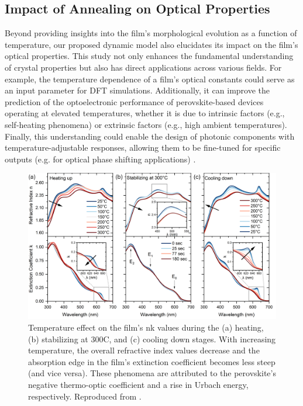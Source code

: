 \subsection{Impact of Annealing on Optical Properties}

Beyond providing insights into the film's morphological evolution as a function of temperature, our proposed dynamic model also elucidates its impact on the film’s optical properties. This study not only enhances the fundamental understanding of crystal properties but also has direct applications across various fields. For example, the temperature dependence of a film's optical constants could serve as an input parameter for DFT simulations. Additionally, it can improve the prediction of the optoelectronic performance of perovskite-based devices operating at elevated temperatures, whether it is due to intrinsic factors (e.g., self-heating phenomena) or extrinsic factors (e.g., high ambient temperatures). Finally, this understanding could enable the design of photonic components with temperature-adjustable responses, allowing them to be fine-tuned for specific outputs (e.g. for optical phase shifting applications) \cite{Handa2019LargePerovskite}.

\begin{figure}
  \centering
  \medskip
  \includegraphics[width=.99\textwidth]{chapters/ellipsometry/image/Optical Constants_labeled.png}
  \caption[Temperature effect on the  film's nk values during the heating, stabilizing at 300\degree C, and cooling down stages.]{Temperature effect on the  film's nk values during the (a) heating, (b) stabilizing at 300\degree C, and (c) cooling down stages. With increasing temperature, the overall refractive index values decrease and the absorption edge in the film's extinction coefficient becomes less steep (and vice versa). These phenomena are attributed to the perovskite's negative thermo-optic coefficient and a rise in Urbach energy, respectively. Reproduced from \cite{Papadopoulou2024InEllipsometry}.}
  \label{fig:ellipsometry:optical_constants}
\end{figure}


